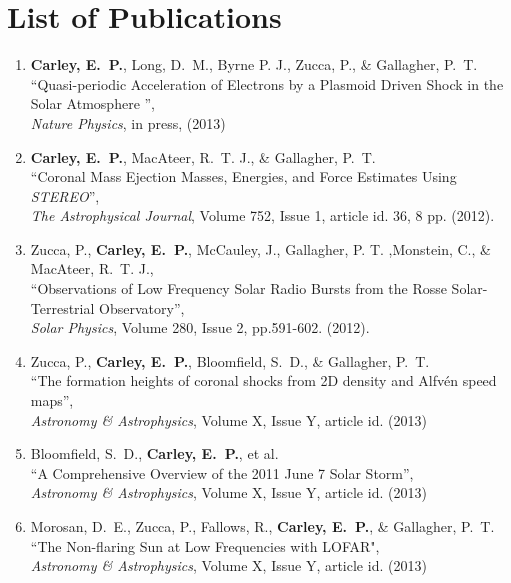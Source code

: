 \chapter{List of Publications}
\label{chapter:publications}


\begin{enumerate}

\item \textbf{Carley, E.~P.}, Long, D.~M., Byrne P. J., Zucca, P., \& Gallagher, P.~T.\\
``Quasi-periodic Acceleration of Electrons by a Plasmoid Driven Shock in the Solar Atmosphere '', \\
\emph{Nature Physics}, in press, (2013)

\item \textbf{Carley, E.~P.}, MacAteer, R.~T. J., \& Gallagher, P.~T.\\
``Coronal Mass Ejection Masses, Energies, and Force Estimates Using \emph{STEREO}'', \\
\emph{The Astrophysical Journal}, Volume 752, Issue 1, article id. 36, 8 pp. (2012).

\item Zucca, P., \textbf{Carley, E.~P.},  McCauley, J., Gallagher, P. T. ,Monstein, C., \& MacAteer, R.~T. J.,\\
``Observations of Low Frequency Solar Radio Bursts from the Rosse Solar-Terrestrial Observatory'', \\
\emph{Solar Physics}, Volume 280, Issue 2, pp.591-602. (2012).

\item Zucca, P., \textbf{Carley, E.~P.}, Bloomfield, S.~D., \& Gallagher, P.~T.\\
``The formation heights of coronal shocks from 2D density and Alfv\'{e}n speed maps'', \\
\emph{Astronomy \& Astrophysics}, Volume X, Issue Y, article id. (2013)

\item Bloomfield, S.~D., \textbf{Carley, E.~P.}, et al.\\
``A Comprehensive Overview of the 2011 June 7 Solar Storm'', \\
\emph{Astronomy \& Astrophysics}, Volume X, Issue Y, article id. (2013)

\item Morosan, D.~E., Zucca, P., Fallows, R., \textbf{Carley, E.~P.}, \& Gallagher, P.~T.
``The Non-flaring Sun at Low Frequencies with LOFAR", \\
\emph{Astronomy \& Astrophysics}, Volume X, Issue Y, article id. (2013)


\end{enumerate}
